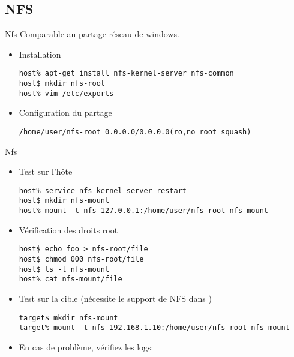\subsection{NFS}

\begin{frame}[fragile=singleslide]{Nfs}
  Comparable au partage réseau de windows.
  \begin{itemize}
  \item Installation
    \begin{lstlisting}
host% apt-get install nfs-kernel-server nfs-common
host$ mkdir nfs-root
host% vim /etc/exports
    \end{lstlisting} %
  \item Configuration du partage
    \begin{lstlisting}
/home/user/nfs-root 0.0.0.0/0.0.0.0(ro,no_root_squash)
    \end{lstlisting}
  \end{itemize}
\end{frame}

\begin{frame}[fragile=singleslide]{Nfs}
  \begin{itemize}
    \item Test sur l'hôte
      \begin{lstlisting}
host% service nfs-kernel-server restart
host$ mkdir nfs-mount
host% mount -t nfs 127.0.0.1:/home/user/nfs-root nfs-mount
      \end{lstlisting} %
    \item Vérification des droits root
      \begin{lstlisting}
host$ echo foo > nfs-root/file
host$ chmod 000 nfs-root/file
host$ ls -l nfs-mount
host% cat nfs-mount/file
      \end{lstlisting} %
     \item Test sur la cible (nécessite le support de NFS dans )
       \begin{lstlisting}
target$ mkdir nfs-mount
target% mount -t nfs 192.168.1.10:/home/user/nfs-root nfs-mount
       \end{lstlisting} %
     \item En cas de problème, vérifiez les logs: 
   \end{itemize}
\end{frame}

